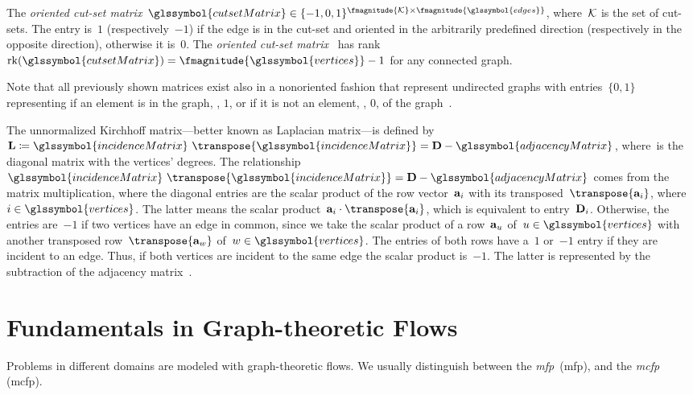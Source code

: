 The \emph{oriented cut-set matrix}~$
    \glssymbol{cutsetMatrix}
    \in
    \{-1, 0, 1\}^{
        \fmagnitude{\cutsets}
        \times
        \fmagnitude{\glssymbol{edges}}
    }
$, where~$\mathcal{K}$ is the set of cut-sets. The entry is~$1$ (respectively~$-1$)
if the edge is in the cut-set and oriented in the arbitrarily predefined
direction (respectively in the opposite direction), otherwise it is~$0$. The
\emph{oriented cut-set matrix}~ has rank~$
    \rank(\glssymbol{cutsetMatrix}) 
    =
    \fmagnitude{\glssymbol{vertices}} - 1
$ for any connected graph.

Note that all previously shown matrices exist also in a nonoriented fashion that
represent undirected graphs with entries~$\{0,1\}$ representing if an element is
in the graph, \ie, $1$, or if it is not an element, \ie, $0$, of the
graph~.

The unnormalized Kirchhoff matrix---better known as Laplacian matrix---is
defined by~$
    \laplaceMatrix 
    \coloneqq
    \glssymbol{incidenceMatrix}~\transpose{\glssymbol{incidenceMatrix}} 
    =
    \diagonalMatrix 
    -
    \glssymbol{adjacencyMatrix}
$, where~\diagonalMatrix is the diagonal matrix with the
vertices' degrees. The relationship~$
    \glssymbol{incidenceMatrix}~\transpose{\glssymbol{incidenceMatrix}} 
    = 
    \diagonalMatrix 
    - 
    \glssymbol{adjacencyMatrix}
$ comes from the matrix multiplication, where the diagonal entries are the
scalar product of the row vector~$\mathbf{a}_i$ with its
transposed~$\transpose{\adjacencyMatrixVector_i}$,
where~$i\in\glssymbol{vertices}$. The latter means the scalar
product~$
    \adjacencyMatrixVector_i
    \cdot
    \transpose{\adjacencyMatrixVector_i}
$, which is equivalent to entry~$\mathbf{D}_i$. Otherwise, the entries
are~$-1$ if two vertices have an edge in common, since we take the scalar
product of a row~$\mathbf{a}_{u}$
of~$\vertexa\in\glssymbol{vertices}$ with another transposed
row~$\transpose{\adjacencyMatrixVector_{\vertexc}}$
of~$\vertexc\in\glssymbol{vertices}$. The entries of both rows have a~$1$
or~$-1$ entry if they are incident to an edge. Thus, if both vertices are
incident to the same edge the scalar product is~$-1$. The latter is represented
by the subtraction of the adjacency matrix~.
% 
\section{Fundamentals in Graph-theoretic Flows}
\label{ch:foundations:sec:graph-theoretical-flows}
% 
Problems in different domains are modeled with graph-theoretic flows. We
usually distinguish between the \emph{\acrlong{mfp}}~(\gls{mfp}), and the
\emph{\acrlong{mcfp}} (\gls{mcfp}).

